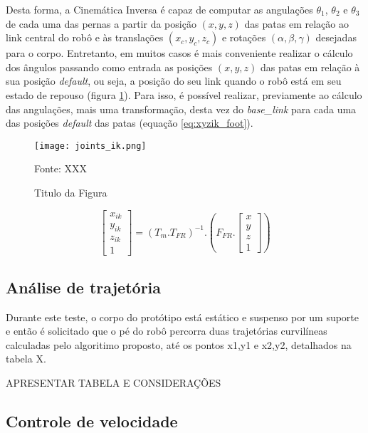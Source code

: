 \documentclass[../main.tex]{subfiles}
\begin{document}
  Desta forma, a Cinemática Inversa é capaz de computar as angulações  $\theta_1$, $\theta_2$ e $\theta_3$ de cada uma das pernas a partir da posição $(x, y, z)$ das patas em relação ao link central do robô e às translações $(x_c, y_c, z_c)$ e rotações $(\alpha, \beta, \gamma)$ desejadas para o corpo. Entretanto, em muitos casos é mais conveniente realizar o cálculo dos ângulos passando como entrada as posições $(x, y, z)$ das patas em relação à sua posição \textit{default}, ou seja, a posição do seu link quando o robô está em seu estado de repouso (figura \ref{fig:joints_ik}). Para isso, é possível realizar, previamente ao cálculo das angulações, mais uma transformação, desta vez do \textit{base\_link} para cada uma das posições \textit{default} das patas (equação \ref{eq:xyzik_foot}).

  \begin{figure}[h]
    \centering
    \caption{Titulo da Figura}
    \texttt{[image: joints\_ik.png]}
    
    Fonte: XXX
    \label{fig:joints_ik}
  \end{figure}


  \begin{equation}
    \label{eq:xyzik_foot}
    \begin{bmatrix}
    x_{ik} \\
    y_{ik} \\
    z_{ik} \\
    1
    \end{bmatrix}= (T_m.T_{FR})^{-1}.
    (F_{FR}.
    \begin{bmatrix}
    x \\
    y \\
    z \\
    1
    \end{bmatrix})
  \end{equation}

  \subsection{Análise de trajetória}
  Durante este teste, o corpo do protótipo está estático e suspenso por um suporte e então é solicitado que o pé do robô percorra duas trajetórias curvilíneas calculadas pelo algoritimo proposto, até os pontos x1,y1 e x2,y2, detalhados na tabela X.

  APRESENTAR TABELA E CONSIDERAÇÕES

  \subsection{Controle de velocidade}
\end{document}
